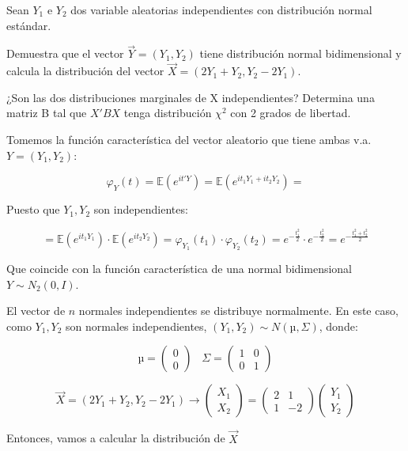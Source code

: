 \begin{problem}[4]
\label{ejrc:4-hoja1}
Sean $Y_1$ e $Y_2$ dos variable aleatorias independientes con distribución normal estándar.

\ppart  Demuestra que el vector $\vec{Y} = (Y_1 , Y_2 )$ tiene distribución normal bidimensional y calcula la distribución del vector $\vec{X} = (2Y_1 + Y_2 , Y_2 − 2Y_1 )$.

\ppart  ¿Son las dos distribuciones marginales de X independientes? Determina una matriz B tal que $X'BX$ tenga distribución $χ^2$ con 2 grados de libertad.
\solution



\spart
{}

Tomemos la función característica del vector aleatorio que tiene ambas v.a. $Y=(Y_1,Y_2)$:

\[φ_Y(t) = \mathbb{E}(e^{it'Y}) = \mathbb{E}(e^{it_1Y_1+it_2Y_2})=\]

Puesto que $Y_1,Y_2$ son independientes:

\[= \mathbb{E}(e^{it_1Y_1})·\mathbb{E}(e^{it_2Y_2}) = φ_{Y_1}(t_1)·φ_{Y_2}(t_2) = e^{-\frac{t_1^2}{2}}·e^{-\frac{t_2^2}{2}}= e^{-\frac{t_1^2+t_2^2}{2}}\]

Que coincide con la función característica de una normal bidimensional $Y\sim N_2(0,I)$.

El vector de $n$ normales independientes se distribuye normalmente. En este caso, como $Y_1,Y_2$ son normales independientes, $(Y_1,Y_2) \sim N(µ,Σ)$, donde:

\[µ = \begin{pmatrix}0\\0\end{pmatrix}\;\;\; Σ = \begin{pmatrix}1&0\\0&1\end{pmatrix}\]

\[\vec{X} = (2Y_1 + Y_2 , Y_2 − 2Y_1 ) \to \begin{pmatrix}X_1\\X_2\end{pmatrix} = \begin{pmatrix}2&1\\1&-2\end{pmatrix}\begin{pmatrix}Y_1\\Y_2\end{pmatrix}\]

Entonces, vamos a calcular la distribución de $\vec{X}$


\end{problem}
